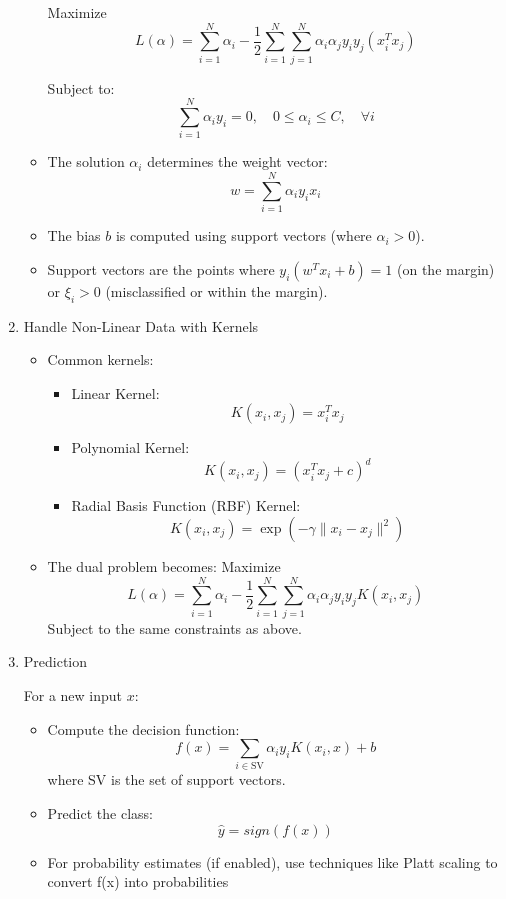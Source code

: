 \begin{enumerate}[label=Step \arabic*:, align=left, leftmargin=20pt,labelsep=1em]
\begin{itemize}
        Maximize
        \[L(\alpha) = \sum_{i=1}^N \alpha_i - \frac{1}{2} \sum_{i=1}^N \sum_{j=1}^N \alpha_i \alpha_j y_i y_j (x_i^T x_j)\]

        Subject to:
        \[\sum_{i=1}^N \alpha_i y_i = 0, \quad 0 \leq \alpha_i \leq C, \quad \forall i\]

        \item The solution $\alpha_i$ determines the weight vector:
            \[w = \sum_{i=1}^N \alpha_i y_i x_i\]
        \item The bias $b$ is computed using support vectors (where $\alpha_i > 0$).
        \item Support vectors are the points where $y_i(w^T x_i + b) = 1$ (on the margin) or $\xi_i > 0$ (misclassified or within the margin).
    \end{itemize}

    \item Handle Non-Linear Data with Kernels
    \begin{itemize}
        For non-linearly separable data, map the input data to a higher-dimensional space using a kernel function $K(x_i, x_j)$.
        \item Common kernels:
        \begin{itemize}
            \item Linear Kernel:
                \[K(x_i, x_j) = x_i^T x_j\]
            \item Polynomial Kernel:
                \[K(x_i, x_j) = (x_i^T x_j + c)^d\]
            \item Radial Basis Function (RBF) Kernel:
                \[K(x_i, x_j) = \exp(-\gamma \|x_i - x_j\|^2)\]
        \end{itemize}

        \item The dual problem becomes: Maximize
            \[L(\alpha) = \sum_{i=1}^N \alpha_i - \frac{1}{2} \sum_{i=1}^N \sum_{j=1}^N \alpha_i \alpha_j y_i y_j K(x_i, x_j)\]
            Subject to the same constraints as above.
    \end{itemize}

    \item Prediction

    For a new input $x$:
    \begin{itemize}
        \item Compute the decision function:
            \[f(x) = \sum_{i \in \text{SV}} \alpha_i y_i K(x_i, x) + b\]
            where SV is the set of support vectors.
        \smallskip
        \item Predict the class:
            \[\hat{y} = sign(f(x))\]
        \item For probability estimates (if enabled), use techniques like Platt scaling to convert f(x) into probabilities
    \end{itemize}
\end{enumerate}

